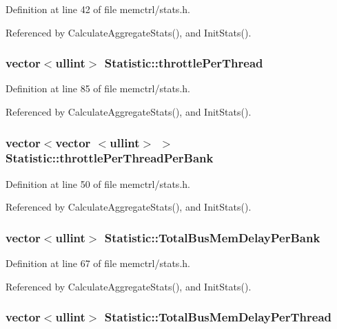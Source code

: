 Definition at line 42 of file memctrl/stats.h.

Referenced by CalculateAggregateStats(), and InitStats().
\subsubsection[{throttlePerThread}]{\setlength{\rightskip}{0pt plus 5cm}vector$<${\bf ullint}$>$ {\bf Statistic::throttlePerThread}}\label{classStatistic_b4d45eb595698971edf90e8895c4d32a}




Definition at line 85 of file memctrl/stats.h.

Referenced by CalculateAggregateStats(), and InitStats().
\subsubsection[{throttlePerThreadPerBank}]{\setlength{\rightskip}{0pt plus 5cm}vector$<$vector $<${\bf ullint}$>$ $>$ {\bf Statistic::throttlePerThreadPerBank}}\label{classStatistic_a9b6e49de7093dd4f815cc1e0b017e05}




Definition at line 50 of file memctrl/stats.h.

Referenced by CalculateAggregateStats(), and InitStats().
\subsubsection[{TotalBusMemDelayPerBank}]{\setlength{\rightskip}{0pt plus 5cm}vector$<${\bf ullint}$>$ {\bf Statistic::TotalBusMemDelayPerBank}}\label{classStatistic_7e5bfce6264cf64886e49c3c846b8e39}




Definition at line 67 of file memctrl/stats.h.

Referenced by CalculateAggregateStats(), and InitStats().
\subsubsection[{TotalBusMemDelayPerThread}]{\setlength{\rightskip}{0pt plus 5cm}vector$<${\bf ullint}$>$ {\bf Statistic::TotalBusMemDelayPerThread}}\label{classStatistic_a8f924663dd4c97d8e8a48c2991a7242}




